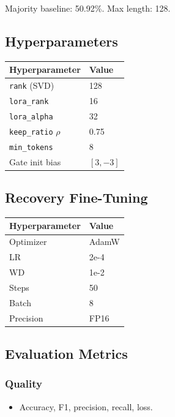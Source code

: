 Majority baseline: 50.92\%. Max length: 128.

\subsection{Hyperparameters}

\begin{table}[H]
\centering
\small
\begin{tabular}{ll}
\toprule
\textbf{Hyperparameter} & \textbf{Value} \\
\midrule
\texttt{rank} (SVD) & 128 \\
\texttt{lora\_rank} & 16 \\
\texttt{lora\_alpha} & 32 \\
\texttt{keep\_ratio} $\rho$ & 0.75 \\
\texttt{min\_tokens} & 8 \\
Gate init bias & $[3, -3]$ \\
\bottomrule
\end{tabular}
\end{table}

\subsection{Recovery Fine-Tuning}

\begin{table}[H]
\centering
\small
\begin{tabular}{ll}
\toprule
\textbf{Hyperparameter} & \textbf{Value} \\
\midrule
Optimizer & AdamW \\
LR & 2e-4 \\
WD & 1e-2 \\
Steps & 50 \\
Batch & 8 \\
Precision & FP16 \\
\bottomrule
\end{tabular}
\end{table}

\subsection{Evaluation Metrics}

\subsubsection{Quality}
\begin{itemize}
\item Accuracy, F1, precision, recall, loss.

\end{itemize}
